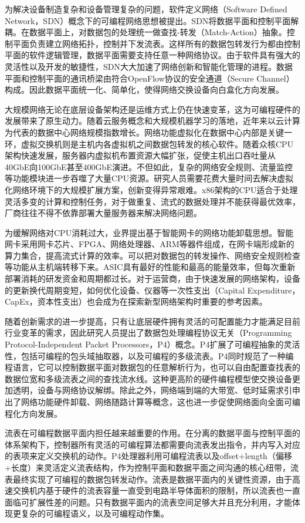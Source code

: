 为解决设备制造复杂和设备管理复杂的问题，软件定义网络（Software Defined Network，SDN）概念下的可编程网络思想被提出。SDN将数据平面和控制平面解耦。在数据平面上，对数据包的处理统一做查找-转发（Match-Action）抽象。控制平面负责建立网络拓扑，控制并下发流表。这样所有的数据包转发行为都由控制平面的软件逻辑管理，数据平面需要支持任意一种网络协议。由于软件具有强大的灵活性以及开发的敏捷性，SDN大大加速了网络创新和智能化管理的进程。数据平面和控制平面的通讯桥梁由符合OpenFlow协议的安全通道（Secure Channel）构成。因此数据平面统一化、简单化，使得网络交换设备向白盒化方向发展。	

大规模网络无论在底层设备架构还是运维方式上仍在快速变革，这为可编程硬件的发展带来了原生动力。随着云服务概念和大规模机器学习的落地，近年来以云计算为代表的数据中心网络规模指数增长。网络功能虚拟化在数据中心内部是关键一环，虚拟交换机则是主机内各虚拟机之间数据包转发的核心软件。随着众核CPU架构快速发展，服务器内虚拟机布置资源大幅扩张，促使主机出口吞吐量从40GbE向100GbE甚至400GbE演进。不但如此，复杂的网络安全规则、流量监控等功能模块进一步吞噬了大量CPU资源。研究人员需要花费大量时间去解决虚拟化网络环境下的大规模扩展方案，创新变得异常艰难。x86架构的CPU适合于处理灵活多变的计算和控制任务，对于做重复、流式的数据处理并不能获得最优效率，厂商往往不得不依靠部署大量服务器来解决网络问题。

为缓解网络对CPU消耗过大，业界提出基于智能网卡的网络功能卸载思想。智能网卡采用网卡芯片、FPGA、网络处理器、ARM等器件组成，在网卡端形成新的算力集合，提高流式计算的效率。可以把对数据包的转发操作、网络安全规则检查等功能从主机端转移下来。ASIC具有最好的性能和最高的能量效率，但每次重新部署消耗的研发资金和周期都过长。对于运营商，由于快速发展的网络架构，设备的更新换代周期变短，如何优化设备、仪器等一次性支出（Capital Expenditure，CapEx，资本性支出）也会成为在探索新型网络架构时重要的参考因素。

随着创新需求的进一步提高，只有让底层硬件拥有灵活的可配置能力才能满足目前行业变革的需求，因此研究人员提出了数据包处理编程协议无关（Programming Protocol-Independent Packet Processors，P4）概念。P4扩展了可编程抽象的灵活性，包括可编程的包头域抽取器，以及可编程的多级流表。P4同时规范了一种编程语言，它可以控制数据平面对数据包的任意解析行为，也可以自由配置查找表的数据位宽和多级流表之间的查找流水线。这种更高阶的硬件编程模型使交换设备更加透明，设备与网络协议解绑。除此之外，网络端到端的大带宽、低时延需求引申出了网络功能硬件卸载、网络随路计算等概念，这也进一步促使网络面向全面可编程化方向发展。

流表在可编程数据平面内担任越来越重要的作用。在分离的数据平面与控制平面的体系架构下，控制器所有灵活的可编程算法都需要向流表发出指令，并内写入对应的表项来定义交换机的动作。P4处理器利用可编程流表以及offset+length（偏移+长度）来灵活定义流表结构，作为控制平面和数据平面之间沟通的核心纽带，流表最终实现了可编程的数据包转发动作。流表是数据平面内的关键性资源，由于高速交换机内基于硬件的流表容量一直受到电路半导体面积的限制，所以流表也一直面临可扩展性差的问题。只有数据平面内的流表空间足够大并且充分利用，才能体现更复杂的可编程语义，以及可编程动作集。

